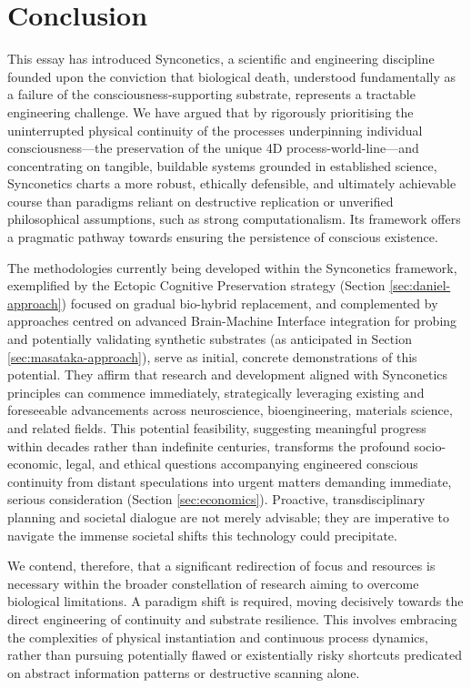 \documentclass[10pt]{article}
\begin{document}
\begin{sloppypar}
  \section{Conclusion}
  \label{sec:conclusion}
  This essay has introduced Synconetics, a scientific and engineering discipline founded upon the conviction that biological death, understood fundamentally as a failure of the consciousness-supporting substrate, represents a tractable engineering challenge. We have argued that by rigorously prioritising the uninterrupted physical continuity of the processes underpinning individual consciousness—the preservation of the unique 4D process-world-line—and concentrating on tangible, buildable systems grounded in established science, Synconetics charts a more robust, ethically defensible, and ultimately achievable course than paradigms reliant on destructive replication or unverified philosophical assumptions, such as strong computationalism. Its framework offers a pragmatic pathway towards ensuring the persistence of conscious existence.

  The methodologies currently being developed within the Synconetics framework, exemplified by the Ectopic Cognitive Preservation strategy (Section \ref{sec:daniel-approach}) focused on gradual bio-hybrid replacement, and complemented by approaches centred on advanced Brain-Machine Interface integration for probing and potentially validating synthetic substrates (as anticipated in Section \ref{sec:masataka-approach}), serve as initial, concrete demonstrations of this potential. They affirm that research and development aligned with Synconetics principles can commence immediately, strategically leveraging existing and foreseeable advancements across neuroscience, bioengineering, materials science, and related fields. This potential feasibility, suggesting meaningful progress within decades rather than indefinite centuries, transforms the profound socio-economic, legal, and ethical questions accompanying engineered conscious continuity from distant speculations into urgent matters demanding immediate, serious consideration (Section \ref{sec:economics}). Proactive, transdisciplinary planning and societal dialogue are not merely advisable; they are imperative to navigate the immense societal shifts this technology could precipitate.

  We contend, therefore, that a significant redirection of focus and resources is necessary within the broader constellation of research aiming to overcome biological limitations. A paradigm shift is required, moving decisively towards the direct engineering of continuity and substrate resilience. This involves embracing the complexities of physical instantiation and continuous process dynamics, rather than pursuing potentially flawed or existentially risky shortcuts predicated on abstract information patterns or destructive scanning alone.


\end{sloppypar}
\end{document}
